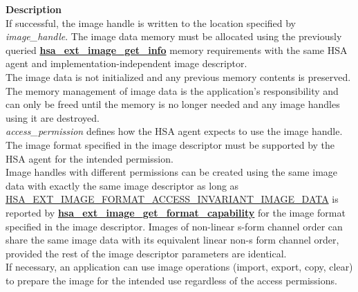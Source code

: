 \documentclass[final,oneside]{book}
\newcommand{\reffun}[1]{\textbf{#1}}
\begin{document}
\vspace{-5mm}\noindent\textbf{Description}\\[1mm]
If successful, the image handle is written to the location specified by \textit{image_\-handle}. The image data memory must be allocated using the previously queried \hyperlink{group__ext-images_1ga432c568dc14e2bf78b3d2de2ecda3b1d}{\reffun{hsa_\-ext_\-image_\-get_\-info}} memory requirements with the same HSA agent and implementation-independent image descriptor.\\[2mm]
The image data is not initialized and any previous memory contents is preserved. The memory management of image data is the application's responsibility and can only be freed until the memory is no longer needed and any image handles using it are destroyed.\\[2mm]
\textit{access_\-permission} defines how the HSA agent expects to use the image handle. The image format specified in the image descriptor must be supported by the HSA agent for the intended permission.\\[2mm]
Image handles with different permissions can be created using the same image data with exactly the same image descriptor as long as \hyperlink{group__ext-images_1ggaef83852ae5fb54b82317e96990da388aa286344b2349f73e9f92400f589a05f60}{HSA_\-EXT_\-IMAGE_\-FORMAT_\-ACCESS_\-INVARIANT_\-IMAGE_\-DATA} is reported by \hyperlink{group__ext-images_1ga7911f56b1bc354c47fde409ace04590c}{\reffun{hsa_\-ext_\-image_\-get_\-format_\-capability}} for the image format specified in the image descriptor. Images of non-linear s-form channel order can share the same image data with its equivalent linear non-s form channel order, provided the rest of the image descriptor parameters are identical.\\[2mm]
If necessary, an application can use image operations (import, export, copy, clear) to prepare the image for the intended use regardless of the access permissions. 
\end{document}
